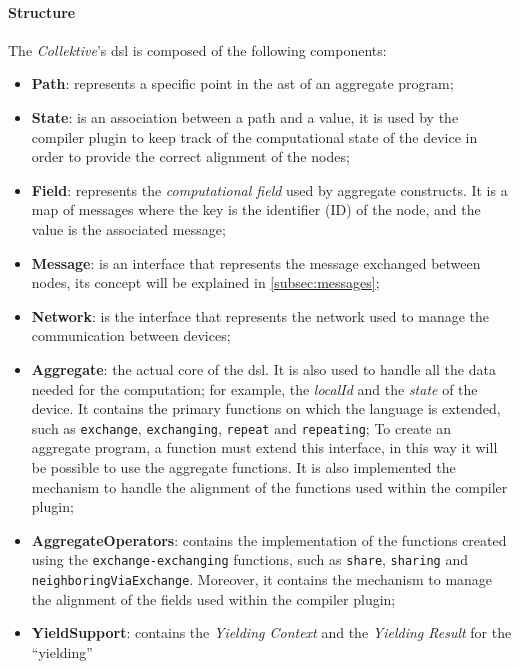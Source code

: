 \paragraph{Structure}
The \emph{Collektive}'s \ac{dsl} is composed of the following components:
\begin{itemize}
    \item \textbf{Path}: represents a specific point in the \ac{ast} of an aggregate program;
    \item \textbf{State}: is an association between a path and a value, it is used by the compiler plugin to
        keep track of the computational state of the device in order to provide the correct alignment of the nodes;
    \item \textbf{Field}: represents the \emph{computational field} used by aggregate constructs.
        It is a map of messages where the key is the identifier (ID) of the node, and the value is the associated message;
    \item \textbf{Message}: is an interface that represents the message exchanged between nodes, its concept will be explained in \ref{subsec:messages};
    \item \textbf{Network}: is the interface that represents the network used to manage the communication between devices;
    \item \textbf{Aggregate}: the actual core of the \ac{dsl}.
        It is also used to handle all the data needed for the computation; for example, the \emph{localId} and the \emph{state} of the device.
        It contains the primary functions on which the language is extended, such as \texttt{exchange}, \texttt{exchanging}, \texttt{repeat} and \texttt{repeating};
        To create an aggregate program, a function must extend this interface, in this way it will be possible to use the aggregate functions.
        It is also implemented the mechanism to handle the alignment of the functions used within the compiler plugin;
    \item \textbf{AggregateOperators}: contains the implementation of the functions created using the \texttt{exchange-exchanging} functions,
        such as \texttt{share}, \texttt{sharing} and \texttt{neighboringViaExchange}.
        Moreover, it contains the mechanism to manage the alignment of the fields used within the compiler plugin;
    \item \textbf{YieldSupport}: contains the \emph{Yielding Context} and the \emph{Yielding Result} for the ``yielding''

\end{itemize}
